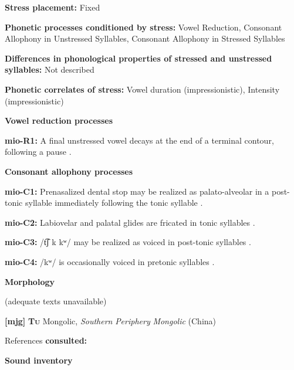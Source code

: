 \textbf{Stress placement:} Fixed



\textbf{Phonetic processes conditioned by stress:} Vowel Reduction, Consonant Allophony in Unstressed Syllables, Consonant Allophony in Stressed Syllables



\textbf{Differences in phonological properties of stressed and unstressed syllables:} Not described



\textbf{Phonetic correlates of stress:} Vowel duration (impressionistic), Intensity (impressionistic)



\textbf{Vowel reduction processes}



\textbf{mio-R1:} A final unstressed vowel decays at the end of a terminal contour, following a pause \citep[13]{Bradley1970}.



\textbf{Consonant allophony processes}



\textbf{mio-C1:} Prenasalized dental stop may be realized as palato-alveolar in a post-tonic syllable immediately following the tonic syllable \citep[6]{Bradley1970}.



\textbf{mio-C2:} Labiovelar and palatal glides are fricated in tonic syllables \citep[8]{Bradley1970}.



\textbf{mio-C3:} /t͡ʃ k kʷ/ may be realized as voiced in post-tonic syllables \citep[5]{Bradley1970}.



\textbf{mio-C4:} /kʷ/ is occasionally voiced in pretonic syllables \citep[5]{Bradley1970}.



\textbf{Morphology}



(adequate texts unavailable)



\textbf{[mjg]}   \textbf{\textsc{Tu}}    Mongolic, \textit{Southern} \textit{Periphery} \textit{Mongolic} (China)



References \textbf{consulted:} \citet{Slater2003}



\textbf{Sound inventory}



